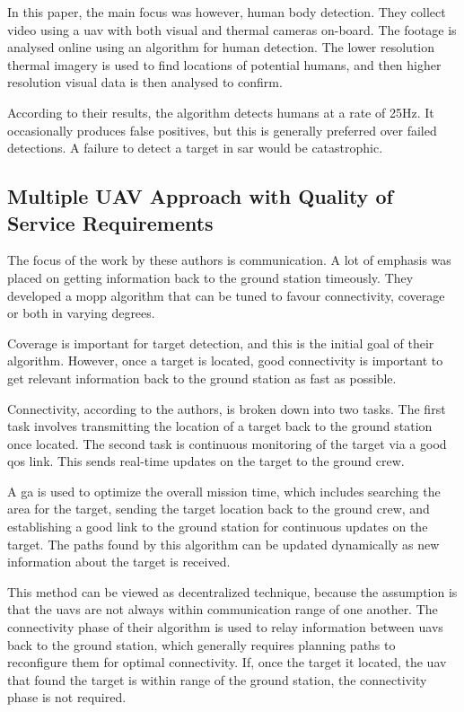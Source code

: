 In this paper, the main focus was however, human body detection. They collect video using a \ac{uav} with both visual and thermal cameras on-board. The footage is analysed online using an algorithm for human detection. The lower resolution thermal imagery is used to find locations of potential humans, and then higher resolution visual data is then analysed to confirm. 

According to their results, the algorithm detects humans at a rate of 25Hz. It occasionally produces false positives, but this is generally preferred over failed detections. A failure to detect a target in \acl{sar} would be catastrophic. 

\subsection{Multiple UAV Approach with Quality of Service Requirements}
\label{sec:LR SAR QoS}
The focus of the work by these authors is communication. A lot of emphasis was placed on getting information back to the ground station timeously. They developed a \ac{mopp} algorithm that can be tuned to favour connectivity, coverage or both in varying degrees. \cite{Hayat2020}

Coverage is important for target detection, and this is the initial goal of their algorithm. However, once a target is located, good connectivity is important to get relevant information back to the ground station as fast as possible.

Connectivity, according to the authors, is broken down into two tasks. The first task involves transmitting the location of a target back to the ground station once located. The second task is continuous monitoring of the target via a good \ac{qos} link. This sends real-time updates on the target to the ground crew.

A \acf{ga} is used to optimize the overall mission time, which includes searching the area for the target, sending the target location back to the ground crew, and establishing a good link to the ground station for continuous updates on the target. The paths found by this algorithm can be updated dynamically as new information about the target is received.

This method can be viewed as decentralized technique, because the assumption is that the \acp{uav} are not always within communication range of one another. The connectivity phase of their algorithm is used to relay information between \acp{uav} back to the ground station, which generally requires planning paths to reconfigure them for optimal connectivity. If, once the target it located, the \ac{uav} that found the target is within range of the ground station, the connectivity phase is not required.

